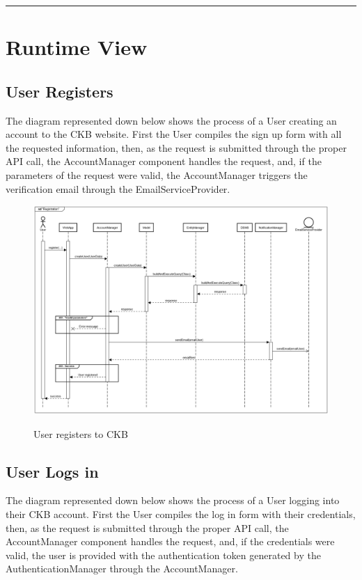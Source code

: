 \documentclass{Configuration_Files/Template}
\begin{document}
{\color{bluepoli}\rule{\linewidth}{0.1pt}}

\section{Runtime View}

\subsection*{User Registers}

The diagram represented down below shows the process of a User creating an account to the CKB website. First the User compiles the sign up form with all the requested information, then, as the request is submitted through the proper API call, the AccountManager component handles the request, and, if the parameters of the request were valid, the AccountManager triggers the verification email through the EmailServiceProvider.

\begin{figure}[H]
\centering
\includegraphics[scale = 0.33]{Images/diagrams/sequences/UserRegisters.png}\\
\caption{User registers to CKB}
\end{figure}

\subsection*{User Logs in}

The diagram represented down below shows the process of a User logging into their CKB account. First the User compiles the log in form with their credentials, then, as the request is submitted through the proper API call, the AccountManager component handles the request, and, if the credentials were valid, the user is provided with the authentication token generated by the AuthenticationManager through the AccountManager.
\end{document}
